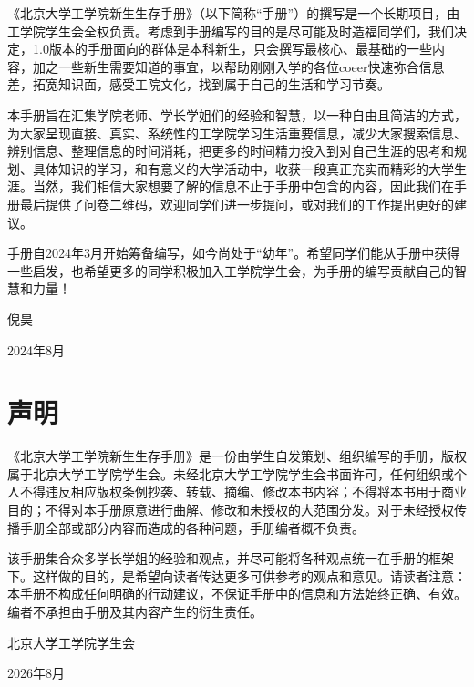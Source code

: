 《北京大学工学院新生生存手册》（以下简称“手册”）的撰写是一个长期项目，由工学院学生会全权负责。考虑到手册编写的目的是尽可能及时造福同学们，我们决定，1.0版本的手册面向的群体是本科新生，只会撰写最核心、最基础的一些内容，加之一些新生需要知道的事宜，以帮助刚刚入学的各位coeer快速弥合信息差，拓宽知识面，感受工院文化，找到属于自己的生活和学习节奏。

\vspace{10pt}

本手册旨在汇集学院老师、学长学姐们的经验和智慧，以一种自由且简洁的方式，为大家呈现直接、真实、系统性的工学院学习生活重要信息，减少大家搜索信息、辨别信息、整理信息的时间消耗，把更多的时间精力投入到对自己生涯的思考和规划、具体知识的学习，和有意义的大学活动中，收获一段真正充实而精彩的大学生涯。当然，我们相信大家想要了解的信息不止于手册中包含的内容，因此我们在手册最后提供了问卷二维码，欢迎同学们进一步提问，或对我们的工作提出更好的建议。

\vspace{10pt}

手册自2024年3月开始筹备编写，如今尚处于“幼年”。希望同学们能从手册中获得一些启发，也希望更多的同学积极加入工学院学生会，为手册的编写贡献自己的智慧和力量！
\begin{flushright}
	倪昊
	
	2024年8月
\end{flushright}

\chapter*{声明}

《北京大学工学院新生生存手册》是一份由学生自发策划、组织编写的手册，版权属于北京大学工学院学生会。未经北京大学工学院学生会书面许可，任何组织或个人不得违反相应版权条例抄袭、转载、摘编、修改本书内容；不得将本书用于商业目的；不得对本手册原意进行曲解、修改和未授权的大范围分发。对于未经授权传播手册全部或部分内容而造成的各种问题，手册编者概不负责。

\vspace{10pt}

该手册集合众多学长学姐的经验和观点，并尽可能将各种观点统一在手册的框架下。这样做的目的，是希望向读者传达更多可供参考的观点和意见。请读者注意：本手册不构成任何明确的行动建议，不保证手册中的信息和方法始终正确、有效。编者不承担由手册及其内容产生的衍生责任。
\begin{flushright}
	北京大学工学院学生会
	
	2026年8月
\end{flushright}

\tableofcontents

\mainmatter
	
